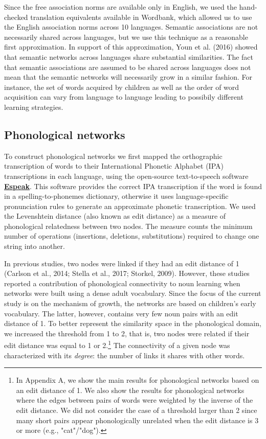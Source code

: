 \documentclass[english,,man,floatsintext]{apa6}
\let\rmarkdownfootnote\footnote%
\def\footnote{\protect\rmarkdownfootnote}
\begin{document}
Since the free association norms are available only in English, we used the hand-checked translation equivalents available in Wordbank, which allowed us to use the English association norms across 10 languages. Semantic associations are not necessarily shared across languages, but we use this technique as a reasonable first approximation. In support of this approximation, Youn et al. (2016) showed that semantic networks across languages share substantial similarities. The fact that semantic associations are assumed to be shared across languages does not mean that the semantic networks will necessarily grow in a similar fashion. For instance, the set of words acquired by children as well as the order of word acquisition can vary from language to language leading to possibily different learning strategies.

\hypertarget{phonological-networks}{%
\subsection{Phonological networks}\label{phonological-networks}}

To construct phonological networks we first mapped the orthographic transcription of words to their International Phonetic Alphabet (IPA) transcriptions in each language, using the open-source text-to-speech software \textbf{\href{http://http://espeak.sourceforge.net/}{Espeak}}. This software provides the correct IPA transcription if the word is found in a spelling-to-phonemes dictionary, otherwise it uses language-specific pronunciation rules to generate an approximate phonetic transcription. We used the Levenshtein distance (also known as edit distance) as a measure of phonological relatedness between two nodes. The measure counts the minimum number of operations (insertions, deletions, substitutions) required to change one string into another.

In previous studies, two nodes were linked if they had an edit distance of 1 (Carlson et al., 2014; Stella et al., 2017; Storkel, 2009). However, these studies reported a contribution of phonological connectivity to noun learning when networks were built using a dense adult vocabulary. Since the focus of the current study is on the mechanism of growth, the networks are based on children's early vocabulary. The latter, however, contains very few noun pairs with an edit distance of 1. To better represent the similarity space in the phonological domain, we increased the threshold from 1 to 2, that is, two nodes were related if their edit distance was equal to 1 or 2.\footnote{In Appendix A, we show the main results for phonological networks based on an edit distance of 1. We also show the results for phonological networks where the edges between pairs of words were weighted by the inverse of the edit distance. We did not consider the case of a threshold larger than 2 since many short pairs appear phonologically unrelated when the edit distance is 3 or more (e.g., "cat"/"dog").} The connectivity of a given node was characterized with its \emph{degree}: the number of links it shares with other words.
\end{document}
